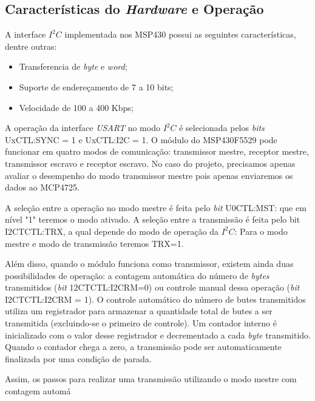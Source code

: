 	\subsection{Características do \textit{Hardware} e Operação}
	
		A interface $ I^2C $ implementada nos MSP430 possui as seguintes características, dentre outras:
		\begin{itemize}
			\item Transferencia de \textit{byte} e \textit{word};
			\item Suporte de endereçamento de 7 a 10 bits;
			\item Velocidade de 100 a 400 Kbps;
		\end{itemize}
	
		A operação da interface \textit{USART} no modo $ I^2C $ é selecionada pelos \textit{bits} UxCTL:SYNC = 1 e UxCTL:I2C = 1. O módulo do MSP430F5529 pode funcionar em quatro modos de comunicação: transmissor mestre, receptor mestre, transmissor escravo e receptor escravo. No caso do projeto, precisamos apenas avaliar o desempenho do modo transmissor mestre pois apenas enviaremos os dados ao MCP4725.
		
		A seleção entre a operação no modo mestre é feita pelo \textit{bit} U0CTL:MST: que em nível "1" teremos o modo ativado. A seleção entre a transmissão é feita pelo bit I2CTCTL:TRX, a qual depende do modo de operação da $ I^2C $: Para o modo mestre e modo de transmissão teremos TRX=1.
		
		Além disso, quando o módulo funciona como transmissor, existem ainda duas possibilidades de operação: a contagem automática do número de \textit{bytes} transmitidos (\textit{bit} 12CTCTL:I2CRM=0) ou controle manual dessa operação (\textit{bit} I2CTCTL:I2CRM = 1). O controle automático do número de butes transmitidos utiliza um registrador para armazenar a quantidade total de butes a ser transmitida (excluindo-se o primeiro de controle). Um contador interno é inicializado com o valor desse registrador e decrementado a cada \textit{byte} transmitido. Quando o contador chega a zero, a transmissão pode ser automaticamente finalizada por uma condição de parada.
		
		Assim, os passos para realizar uma transmissão utilizando o modo mestre com contagem automá
		
			
		
		
		 
		
		